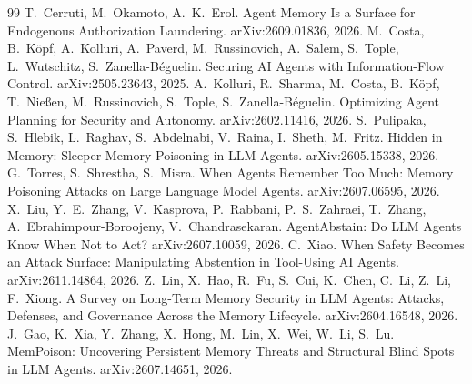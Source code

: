 \documentclass[10pt]{article}
\begin{document}
\begin{thebibliography}{99}
 T.~Cerruti, M.~Okamoto, A.~K.~Erol. Agent Memory Is a Surface for Endogenous
Authorization Laundering. arXiv:2609.01836, 2026.
 M.~Costa, B.~K\"opf, A.~Kolluri, A.~Paverd, M.~Russinovich, A.~Salem, S.~Tople,
L.~Wutschitz, S.~Zanella-B\'eguelin. Securing AI Agents with Information-Flow Control.
arXiv:2505.23643, 2025.
 A.~Kolluri, R.~Sharma, M.~Costa, B.~K\"opf, T.~Nie{\ss}en, M.~Russinovich,
S.~Tople, S.~Zanella-B\'eguelin. Optimizing Agent Planning for Security and Autonomy.
arXiv:2602.11416, 2026.
 S.~Pulipaka, S.~Hlebik, L.~Raghav, S.~Abdelnabi, V.~Raina, I.~Sheth,
M.~Fritz. Hidden in Memory: Sleeper Memory Poisoning in LLM Agents. arXiv:2605.15338, 2026.
 G.~Torres, S.~Shrestha, S.~Misra. When Agents Remember Too Much: Memory
Poisoning Attacks on Large Language Model Agents. arXiv:2607.06595, 2026.
 X.~Liu, Y.~E.~Zhang, V.~Kasprova, P.~Rabbani, P.~S.~Zahraei, T.~Zhang,
A.~Ebrahimpour-Boroojeny, V.~Chandrasekaran. AgentAbstain: Do LLM Agents Know When Not to Act?
arXiv:2607.10059, 2026.
 C.~Xiao. When Safety Becomes an Attack Surface: Manipulating Abstention
in Tool-Using AI Agents. arXiv:2611.14864, 2026.
 Z.~Lin, X.~Hao, R.~Fu, S.~Cui, K.~Chen, C.~Li, Z.~Li, F.~Xiong. A Survey on
Long-Term Memory Security in LLM Agents: Attacks, Defenses, and Governance Across the Memory
Lifecycle. arXiv:2604.16548, 2026.
 J.~Gao, K.~Xia, Y.~Zhang, X.~Hong, M.~Lin, X.~Wei, W.~Li, S.~Lu. MemPoison:
Uncovering Persistent Memory Threats and Structural Blind Spots in LLM Agents. arXiv:2607.14651,
2026.
\end{thebibliography}
\end{document}
